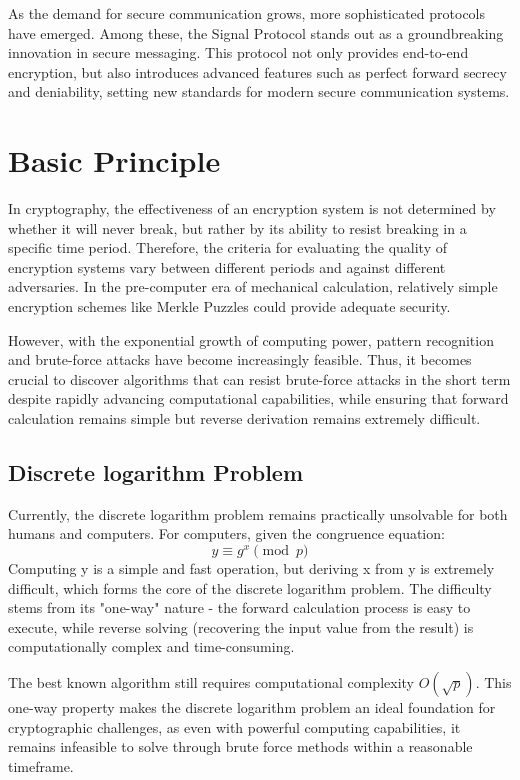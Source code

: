 \documentclass[9pt,a4paper,twoside]{rho-class/rho}
\begin{document}
    As the demand for secure communication grows, more sophisticated protocols have emerged. Among these, the Signal Protocol stands out as a groundbreaking innovation in secure messaging. This protocol not only provides end-to-end encryption, but also introduces advanced features such as perfect forward secrecy and deniability, setting new standards for modern secure communication systems.
    
\section{Basic Principle}

    In cryptography, the effectiveness of an encryption system is not determined by whether it will never break, but rather by its ability to resist breaking in a specific time period. Therefore, the criteria for evaluating the quality of encryption systems vary between different periods and against different adversaries. In the pre-computer era of mechanical calculation, relatively simple encryption schemes like Merkle Puzzles could provide adequate security. 

    However, with the exponential growth of computing power, pattern recognition and brute-force attacks have become increasingly feasible. Thus, it becomes crucial to discover algorithms that can resist brute-force attacks in the short term despite rapidly advancing computational capabilities, while ensuring that forward calculation remains simple but reverse derivation remains extremely difficult.

    \subsection{Discrete logarithm Problem}
        Currently, the discrete logarithm problem remains practically unsolvable for both humans and computers. For computers, given the congruence equation:
        $$ y \equiv g^x \pmod{p} $$
        Computing y is a simple and fast operation, but deriving x from y is extremely difficult, which forms the core of the discrete logarithm problem. The difficulty stems from its "one-way" nature - the forward calculation process is easy to execute, while reverse solving (recovering the input value from the result) is computationally complex and time-consuming. 
        
        The best known algorithm still requires computational complexity $O(\sqrt{p})$. This one-way property makes the discrete logarithm problem an ideal foundation for cryptographic challenges, as even with powerful computing capabilities, it remains infeasible to solve through brute force methods within a reasonable timeframe.
        
\end{document}
